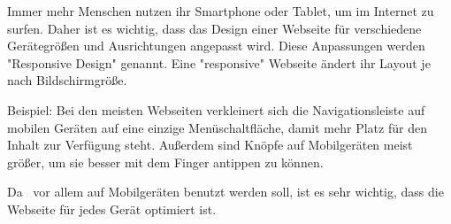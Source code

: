 
Immer mehr Menschen nutzen ihr Smartphone oder Tablet, um im Internet zu surfen. 
Daher ist es wichtig, dass das Design einer Webseite für verschiedene Gerätegrößen und Ausrichtungen angepasst wird. 
Diese Anpassungen werden "Responsive Design" genannt. 
Eine "responsive" Webseite ändert ihr Layout je nach Bildschirmgröße.

Beispiel: 
Bei den meisten Webseiten verkleinert sich die Navigationsleiste auf mobilen Geräten auf eine einzige Menüschaltfläche, damit mehr Platz für den Inhalt zur Verfügung steht.
Außerdem sind Knöpfe auf Mobilgeräten meist größer, um sie besser mit dem Finger antippen zu können. 

Da \ZELIA\ vor allem auf Mobilgeräten benutzt werden soll, ist es sehr wichtig, dass die Webseite für jedes Gerät optimiert ist. 

